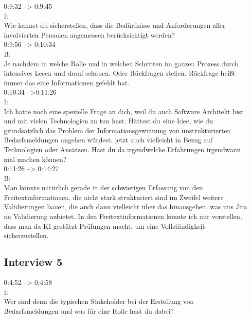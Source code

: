 0:9:32 --> 0:9:45\\
I:\\
Wie kannst du sicherstellen, dass die Bedürfnisse und Anforderungen aller involvierten Personen angemessen berücksichtigt werden?\\

0:9:56 --> 0:10:34\\
B:\\
Je nachdem in welche Rolle und in welchen Schritten im ganzen Prozess durch intensives Lesen und drauf schauen. Oder Rückfragen stellen. Rückfrage heißt immer das eine Informationen gefehlt hat.\\

0:10:34 -->0:11:26\\
I:\\
Ich hätte noch eine spezielle Frage an dich, weil du auch Software Architekt bist und mit vielen Technologien zu tun hast. Hättest du eine Idee, wie du grundsätzlich das Problem der Informationsgewinnung von unstrukturierten Bedarfsmeldungen angehen würdest. jetzt auch vielleicht in Bezug auf Technologien oder Ansätzen. Hast du da irgendwelche Erfahrungen irgendwann mal machen können?\\

0:11:26 --> 0:14:27\\
B:\\
Man könnte natürlich gerade in der schwierigen Erfassung von den Freitextinformationen, die nicht stark strukturiert sind im Zweifel weitere Validierungen bauen, die auch dann vielleicht über das hinausgehen, was uns Jira an Validierung anbietet. In den Freitextinformationen könnte ich mir vorstellen, dass man da KI gestützt Prüfungen macht, um eine Vollständigkeit sicherzustellen.\\
\subsection{Interview 5}
\label{interview5}
0:4:52 --> 0:4:58\\
I:\\
Wer sind denn die typischen Stakeholder bei der Erstellung von Bedarfsmeldungen und was für eine Rolle hast du dabei?\\

